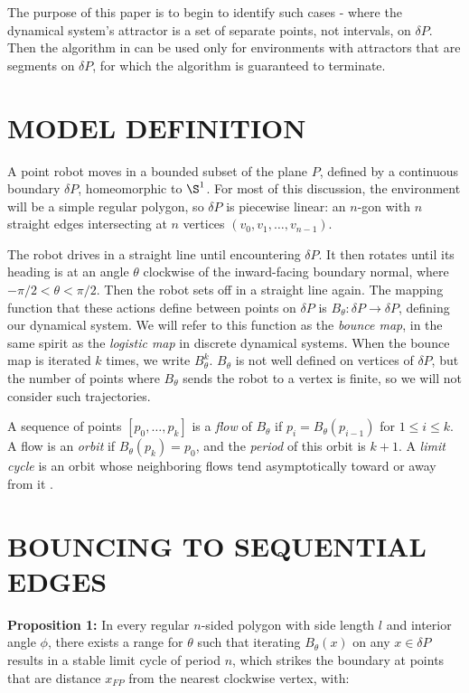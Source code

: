 \documentclass[letterpaper, 10 pt, conference]{ieeeconf}  %
\begin{document}
The purpose of this paper is to begin to identify such cases -
where the dynamical system's attractor is a set of separate points, not intervals, on
$\delta P$. Then the
algorithm in \cite{bounce} can be used only for environments with attractors that are
segments on $\delta P$, for which the algorithm is guaranteed to terminate.


\section{MODEL DEFINITION}

A point robot moves in a bounded subset of the plane $P$,
defined by a continuous boundary $\delta P$, homeomorphic to  $\S^1$. For most 
of this discussion, the environment will be a simple regular polygon, so $\delta P$ 
is piecewise linear: an $n$-gon with $n$ straight edges intersecting at $n$ vertices
$(v_0, v_1, \ldots, v_{n-1})$. 

The robot drives in a straight line until encountering $\delta P$. It then rotates
until its heading is at an angle $\theta$ clockwise of the inward-facing boundary
normal, where $-\pi/2 < \theta < \pi/2$. Then the robot sets off in a
straight line again. The mapping function that these actions define between points
on $\delta P$ is $B_{\theta}: \delta P \to \delta P$, defining our dynamical system.
We will refer to this function as the \textit{bounce map}, in the same spirit as
the \textit{logistic map} in discrete dynamical systems.
When the bounce map is iterated $k$ times, we write $B^k_{\theta}$.
$B_{\theta}$ is not well defined
on vertices of $\delta P$, but the number of points where $B_{\theta}$ sends
the robot to a vertex is finite, so we will not consider such trajectories.

A sequence of points $[p_0, \ldots, p_k]$ is a \textit{flow} of $B_{\theta}$ if
$p_i = B_{\theta}(p_{i-1})$ for $1 \leq i \leq k$. A flow is an \textit{orbit} if
$B_{\theta}(p_k) = p_0$, and the \textit{period} of this orbit is $k+1$. A \textit{limit
cycle} is an orbit whose neighboring flows tend asymptotically toward or away from it
\cite{jackson1992}.


\section{BOUNCING TO SEQUENTIAL EDGES}

\textbf{Proposition 1:} In every regular $n$-sided polygon with side length $l$
and interior angle $\phi$, there exists a range for $\theta$ such that iterating
$B_{\theta}(x)$ on any $x \in \delta P$ results in a stable limit cycle of
period $n$, which strikes the boundary at points that are distance $x_{FP}$ from
the nearest clockwise vertex, with:
\end{document}

